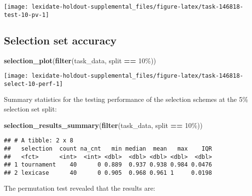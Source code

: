 \documentclass[
]{book}
\newenvironment{Shaded}{\begin{snugshade}}{\end{snugshade}}
\newcommand{\FunctionTok}[1]{\textcolor[rgb]{0.13,0.29,0.53}{\textbf{#1}}}
\newcommand{\NormalTok}[1]{#1}
\newcommand{\SpecialCharTok}[1]{\textcolor[rgb]{0.81,0.36,0.00}{\textbf{#1}}}
\newcommand{\StringTok}[1]{\textcolor[rgb]{0.31,0.60,0.02}{#1}}
\begin{document}
\texttt{[image: lexidate-holdout-supplemental\_files/figure-latex/task-146818-test-10-pv-1]}

\hypertarget{selection-set-accuracy-1}{%
\subsection{Selection set accuracy}\label{selection-set-accuracy-1}}

\begin{Shaded}
\begin{Highlighting}[]
\FunctionTok{selection\_plot}\NormalTok{(}\FunctionTok{filter}\NormalTok{(task\_data, split }\SpecialCharTok{==} \StringTok{\textquotesingle{}10\%\textquotesingle{}}\NormalTok{))}
\end{Highlighting}
\end{Shaded}

\texttt{[image: lexidate-holdout-supplemental\_files/figure-latex/task-146818-select-10-perf-1]}

Summary statistics for the testing performance of the selection schemes at the 5\% selection set split:

\begin{Shaded}
\begin{Highlighting}[]
\FunctionTok{selection\_results\_summary}\NormalTok{(}\FunctionTok{filter}\NormalTok{(task\_data, split }\SpecialCharTok{==} \StringTok{\textquotesingle{}10\%\textquotesingle{}}\NormalTok{))}
\end{Highlighting}
\end{Shaded}

\begin{verbatim}
## # A tibble: 2 x 8
##   selection  count na_cnt   min median  mean   max    IQR
##   <fct>      <int>  <int> <dbl>  <dbl> <dbl> <dbl>  <dbl>
## 1 tournament    40      0 0.889  0.937 0.938 0.984 0.0476
## 2 lexicase      40      0 0.905  0.968 0.961 1     0.0198
\end{verbatim}

The permutation test revealed that the results are:
\end{document}
